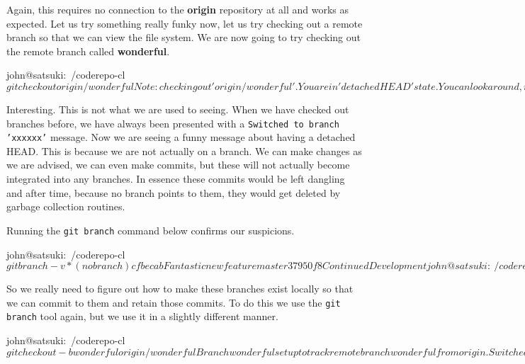 Again, this requires no connection to the \textbf{origin} repository at all and works as expected.
Let us try something really funky now, let us try checking out a remote branch so that we can view the file system.
We are now going to try checking out the remote branch called \textbf{wonderful}.

\begin{code}
john@satsuki:~/coderepo-cl$ git checkout origin/wonderful
Note: checking out 'origin/wonderful'.

You are in 'detached HEAD' state. You can look around, make experimental
changes and commit them, and you can discard any commits you make in this 
state without impacting any branches by performing another checkout.

If you want to create a new branch to retain commits you create, you may
do so (now or later) by using -b with the checkout command again. Example:

  git checkout -b new_branch_name

HEAD is now at cfbecab... Fantastic new feature
john@satsuki:~/coderepo-cl$
\end{code}

Interesting.
This is not what we are used to seeing.
When we have checked out branches before, we have always been presented with a \texttt{Switched to branch 'xxxxxx'} message.
Now we are seeing a funny message about having a detached HEAD.
This is because we are not actually on a branch.
We can make changes as we are advised, we can even make commits, but these will not actually become integrated into any branches.
In essence these commits would be left dangling and after time, because no branch points to them, they would get deleted by garbage collection routines.

Running the \texttt{git branch} command below confirms our suspicions.

\begin{code}
john@satsuki:~/coderepo-cl$ git branch -v
* (no branch) cfbecab Fantastic new feature
  master      37950f8 Continued Development
john@satsuki:~/coderepo-cl$
\end{code}

So we really need to figure out how to make these branches exist locally so that we can commit to them and retain those commits.
To do this we use the \texttt{git branch} tool again, but we use it in a slightly different manner.

\begin{code}
john@satsuki:~/coderepo-cl$ git checkout -b wonderful origin/wonderful
Branch wonderful set up to track remote branch wonderful from origin.
Switched to a new branch 'wonderful'
john@satsuki:~/coderepo-cl$
\end{code}

